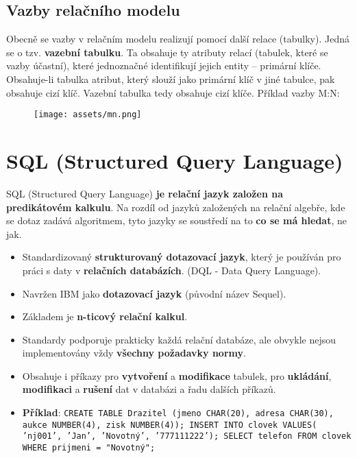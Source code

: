 \subsection{Vazby relačního modelu}
Obecně se vazby v relačním modelu realizují pomocí další relace (tabulky). Jedná se o tzv. \textbf{vazební tabulku}. Ta obsahuje ty atributy relací (tabulek, které se vazby účastní), které jednoznačné identifikují jejich entity -- primární klíče. Obsahuje-li tabulka atribut, který slouží jako primární klíč v jiné tabulce, pak obsahuje cizí klíč. Vazební tabulka tedy obsahuje cizí klíče. Příklad vazby M:N:

\begin{figure}[H]
    \centering
    \texttt{[image: assets/mn.png]}
\end{figure}

\section{SQL (Structured Query Language)}
SQL (Structured Query Language) \textbf{je relační jazyk založen na predikátovém kalkulu}. Na rozdíl od jazyků založených na relační algebře, kde se dotaz zadává algoritmem, tyto jazyky se soustředí na to \textbf{co se má hledat}, ne jak.

\begin{itemize}
    \item Standardizovaný\textbf{ strukturovaný dotazovací jazyk}, který je používán pro práci s daty v \textbf{relačních databázích}. (DQL - Data Query Language).
    \item Navržen IBM jako \textbf{dotazovací jazyk} (původní název Sequel).
    \item Základem je \textbf{n-ticový relační kalkul}.
    \item Standardy podporuje prakticky každá relační databáze, ale obvykle nejsou implementovány vždy\textbf{ všechny požadavky normy}.
    \item Obsahuje i příkazy pro \textbf{vytvoření} a \textbf{modifikace} tabulek, pro \textbf{ukládání}, \textbf{modifikaci} a \textbf{rušení} dat v databázi a řadu dalších příkazů.
    \item \textbf{Příklad}: \texttt{CREATE TABLE Drazitel (jmeno CHAR(20), adresa CHAR(30), aukce NUMBER(4), zisk NUMBER(4)); INSERT INTO  clovek VALUES( 'nj001', 'Jan', 'Novotný', '777111222'); SELECT telefon FROM clovek WHERE prijmeni = "Novotný";}
\end{itemize}

